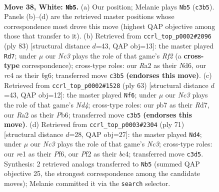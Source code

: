 \documentclass[11pt]{article}
\begin{document}
\clearpage

\begin{figure}[p]\centering
\begin{subfigure}{0.46\textwidth}\centering
\resizebox{\linewidth}{!}{%
\newchessgame
\chessboard[
  setfen={5b2/pp5k/6p1/5p1p/P1r5/2N3P1/RPP2PKP/4r3 w - - 2 38},
  showmover=false,
  pgfstyle=straightmove, color=movearrow, markmove={c3-b5}
]}
\caption{}
\end{subfigure}\hfill
\begin{subfigure}{0.46\textwidth}\centering
\resizebox{\linewidth}{!}{%
\newchessgame
\chessboard[
  setfen={7R/1pk2r2/2pn1pB1/p5p1/P2K2P1/4P3/1P3P2/8 b - - 4 42},
  showmover=false,
  pgfstyle=straightmove, color=movearrow, markmove={f7-d7}
]}
\caption{}
\end{subfigure}
\\[4pt]
\begin{subfigure}{0.46\textwidth}\centering
\resizebox{\linewidth}{!}{%
\newchessgame
\chessboard[
  setfen={4R3/1p1r1ppk/1p4p1/1P1np3/8/1B4P1/1P3P1P/6K1 b - - 5 32},
  showmover=false,
  pgfstyle=straightmove, color=movearrow, markmove={d5-f6}
]}
\caption{}
\end{subfigure}\hfill
\begin{subfigure}{0.46\textwidth}\centering
\resizebox{\linewidth}{!}{%
\newchessgame
\chessboard[
  setfen={8/2R1p3/2nr1ppk/p6p/P1B5/4KPP1/1P5P/8 b - - 11 36},
  showmover=false,
  pgfstyle=straightmove, color=movearrow, markmove={c6-d4}
]}
\caption{}
\end{subfigure}
\caption{\textbf{Move 38, White: \texttt{Nb5}.} (a) Our position; Melanie plays \texttt{Nb5} (\texttt{c3b5}). Panels (b)--(d) are the retrieved master positions whose correspondence most drove this move (highest QAP objective among those that transfer to it). (b) Retrieved from \texttt{ccrl\_top\_p0002\#2096} (ply 83) [structural distance $d$=43, QAP obj=13]: the master played \texttt{Rd7}; under $\mu$ our \emph{Nc3} plays the role of that game's \emph{Rf2} (a \textbf{cross-type} correspondence); cross-type roles: our \emph{R}a2 as their \emph{N}d6, our \emph{r}c4 as their \emph{b}g6; transferred move \texttt{c3b5} \textbf{(endorses this move)}. (c) Retrieved from \texttt{ccrl\_top\_p0002\#1528} (ply 63) [structural distance $d$=43, QAP obj=12]: the master played \texttt{Nf6}; under $\mu$ our \emph{Nc3} plays the role of that game's \emph{Nd4}; cross-type roles: our \emph{p}b7 as their \emph{R}d7, our \emph{R}a2 as their \emph{P}b6; transferred move \texttt{c3b5} \textbf{(endorses this move)}. (d) Retrieved from \texttt{ccrl\_top\_p0003\#2304} (ply 71) [structural distance $d$=28, QAP obj=27]: the master played \texttt{Nd4}; under $\mu$ our \emph{Nc3} plays the role of that game's \emph{Nc3}; cross-type roles: our \emph{r}e1 as their \emph{P}f6, our \emph{P}f2 as their \emph{b}c4; transferred move \texttt{c3d5}. Synthesis: 2 retrieved analogs transferred to \texttt{Nb5} (summed QAP objective 25, the strongest correspondence among the candidate moves); Melanie committed it via the \texttt{search} selector.}
\label{fig:thought-m74}
\end{figure}
\end{document}
